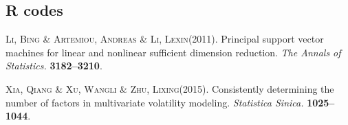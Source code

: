\documentclass[11pt]{scrartcl} %
\begin{document}
\subsection{R codes}



\begin{thebibliography}{}

\textsc{Li, Bing} \& \textsc{Artemiou, Andreas} \& \textsc{Li, Lexin}(2011).
\newblock Principal support vector machines for linear and nonlinear sufficient dimension reduction.
\newblock \textit{The Annals of Statistics.}
\textbf{3182--3210}.

\textsc{Xia, Qiang} \& \textsc{Xu, Wangli} \& \textsc{Zhu, Lixing}(2015).
\newblock Consistently determining the number of factors in multivariate volatility modeling.
\newblock \textit{Statistica Sinica.}
\textbf{1025--1044}.


\end{thebibliography}







\end{document}
